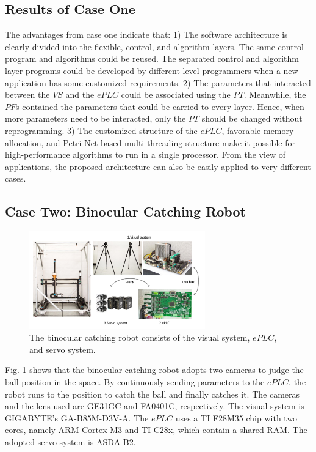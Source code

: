 \documentclass[journal,UTF8]{IEEEtran}
\begin{document}
	\subsection{Results of Case One}
	The advantages from case one indicate that:
	1) The software architecture is clearly divided into the flexible, control, and algorithm layers. The same control program and algorithms could be reused. The separated control and algorithm layer programs could be developed by different-level programmers when a new application has some customized requirements.
	2) The parameters that interacted between the $VS$ and the $ePLC$ could be associated using the $PT$. Meanwhile, the $PF$s contained the parameters that could be carried to every layer. Hence, when more parameters need to be interacted, only the $PT$ should be changed without reprogramming.
	3) The customized structure of the $ePLC$, favorable memory allocation, and Petri-Net-based multi-threading structure make it possible for high-performance algorithms to run in a single processor. From the view of applications, the proposed architecture can also be easily applied to very different cases.
	
	
	\subsection{Case Two: Binocular Catching Robot}
	\begin{figure}
		\centering
		\includegraphics[width=3in]{fig/robot.pdf}
		\caption{ The binocular catching robot consists of the visual system, $ePLC$, and servo system.}
		\label{fig:robot}
	\end{figure}
	Fig. \ref{fig:robot} shows that the binocular catching robot adopts two cameras to judge the ball position in the space. By continuously sending parameters to the $ePLC$, the robot runs to the position to catch the ball and finally catches it. The cameras and the lens used are GE31GC and FA0401C, respectively. The visual system is GIGABYTE's GA-B85M-D3V-A. The $ePLC$ uses a TI F28M35 chip with two cores, namely ARM Cortex M3 and TI C28x, which contain a shared RAM. The adopted servo system is ASDA-B2. 
\end{document}
